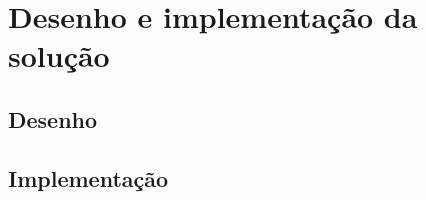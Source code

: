 \chapter{Desenho e implementação da solução}
\label{cap:desenho}

\section{Desenho}
\label{sec:desenho:desenho}






\section{Implementação}
\label{sec:implementacao:desenho}









